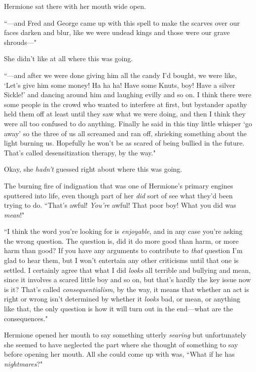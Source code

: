Hermione sat there with her mouth wide open.

``---and Fred and George came up with this spell to make the scarves over our faces darken and blur, like we were undead kings and those were our grave shrouds---"

She didn't like at all where this was going.

``---and after we were done giving him all the candy I'd bought, we were like, `Let's give him some money! Ha ha ha! Have some Knuts, boy! Have a silver Sickle!' and dancing around him and laughing evilly and so on. I think there were some people in the crowd who wanted to interfere at first, but bystander apathy held them off at least until they saw what we were doing, and then I think they were all too confused to do anything. Finally he said in this tiny little whisper `go away' so the three of us all screamed and ran off, shrieking something about the light burning us. Hopefully he won't be as scared of being bullied in the future. That's called desensitization therapy, by the way."

Okay, she \emph{hadn't} guessed right about where this was going.

The burning fire of indignation that was one of Hermione's primary engines sputtered into life, even though part of her \emph{did} sort of see what they'd been trying to do. ``That's awful! \emph{You're} awful! That poor boy! What you did was \emph{mean}!"

``I think the word you're looking for is \emph{enjoyable}, and in any case you're asking the wrong question. The question is, did it do more good than harm, or more harm than good? If you have any arguments to contribute to \emph{that} question I'm glad to hear them, but I won't entertain any other criticisms until that one is settled. I certainly agree that what I did \emph{looks} all terrible and bullying and mean, since it involves a scared little boy and so on, but that's hardly the key issue now is it? That's called \emph{consequentialism}, by the way, it means that whether an act is right or wrong isn't determined by whether it \emph{looks} bad, or mean, or anything like that, the only question is how it will turn out in the end---what are the consequences."

Hermione opened her mouth to say something utterly \emph{searing} but unfortunately she seemed to have neglected the part where she thought of something to say before opening her mouth. All she could come up with was, ``What if he has \emph{nightmares}?"

